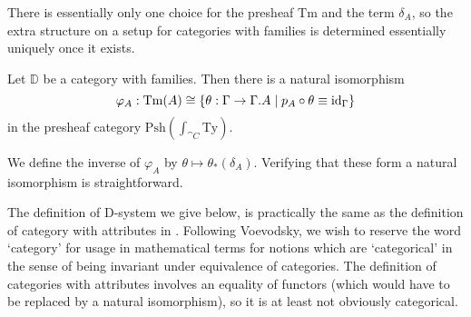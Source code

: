 There is essentially only one choice for the presheaf $\mathrm{Tm}$ and the
term $\delta_A$, so the extra structure on a setup for categories with families
is determined essentially uniquely once it exists.

\begin{defn}\label{lem:cwf_to_dsys}
Let $\mathbb{D}$ be a category with families. Then there is a natural isomorphism
\begin{equation*}
\varphi_A:\mathrm{Tm}(A)\cong\{\theta:\Gamma\to\ctxext{\Gamma}{A}\mid p_A\circ\theta\jdeq\catid{\Gamma}\}
\end{equation*}
in the presheaf category $\mathrm{Psh}(\int_{\cat{C}}\mathrm{Ty})$. 
\begin{comment}
The
natural isomorphism $\varphi$ is such that the term $\delta_A\in\mathrm{Tm}((p_A)_\ast(A))$
corresponds to the unique arrow $\tilde{q}_A$ which fits in the diagram
\begin{equation*}
\begin{tikzcd}
\ctxext{\Gamma}{A} \arrow[ddr,bend right=15,equals] \arrow[drr,bend left=15,equals] \arrow[dr,"{\tilde \delta_A}"] \\
& \ctxext{{\Gamma}{A}}{(p_A)_\ast(A)} \arrow[d,fib] & \ctxext{\Gamma}{A} \arrow[d,fib] \\
& \ctxext{\Gamma}{A} \arrow[r,"{p_A}"] & \Gamma
\end{tikzcd}
\end{equation*}
\end{comment}
\end{defn}

\begin{constr}
We define the inverse of $\varphi_A$ by $\theta\mapsto\theta_\ast(\delta_A)$. Verifying
that these form a natural isomorphism is straightforward.
\end{constr}

The definition of D-system we give below, is practically the same as the definition
of category with attributes in \cite[Definition 3.10]{Hofmann_syntax_semantics}.
Following Voevodsky, we wish to reserve the word `category' for usage in mathematical terms
for notions which are `categorical' in the sense of being invariant under 
equivalence of categories. The definition of categories with attributes involves
an equality of functors (which would have to be replaced by a natural 
isomorphism), so it is at least not obviously categorical.

